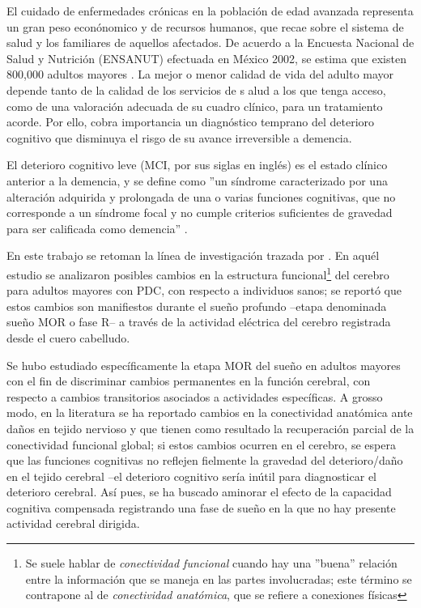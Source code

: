 \documentclass[12pt,a4paper]{mitthesis}
\begin{document}
El cuidado de enfermedades cr\'onicas en la poblaci\'on de edad avanzada representa un gran peso 
econ\'onomico y de recursos humanos, que recae sobre el sistema de salud y los familiares de 
aquellos afectados. 
De acuerdo a la Encuesta Nacional de Salud y Nutrici\'on (ENSANUT) efectuada en M\'exico 2002, se 
estima que existen 800,000 adultos mayores \cite{Sosa12}. 
La mejor o menor calidad de vida del adulto mayor depende tanto de la calidad de los servicios de s
alud a los que tenga acceso, como de una valoraci\'on adecuada de su cuadro cl\'inico, para un 
tratamiento acorde. Por ello, cobra importancia un diagn\'ostico temprano del deterioro cognitivo 
que disminuya el risgo de su avance irreversible a demencia.

El deterioro cognitivo leve (MCI, por sus siglas en ingl\'es) es el estado cl\'inico anterior a la
demencia, y se define como ''un s\'indrome caracterizado por una alteraci\'on adquirida y 
prolongada de una o varias funciones cognitivas, que no corresponde a un s\'indrome focal y no 
cumple criterios suficientes de gravedad para ser calificada como demencia'' \cite{Robles02}.

En este trabajo se retoman %
la l\'inea de investigaci\'on trazada por \cite{VazquezTagle16}.
En aqu\'el estudio se analizaron
posibles cambios en la estructura funcional\footnote{Se suele hablar de 
\textit{conectividad funcional} cuando hay una ''buena'' relaci\'on entre la informaci\'on
que se maneja en las partes involucradas; este t\'ermino se contrapone al de
\textit{conectividad anat\'omica}, que se refiere a conexiones f\'isicas}
del cerebro para adultos mayores con PDC, con 
respecto a individuos sanos; se report\'o que estos cambios son manifiestos durante el sue\~no
profundo --etapa denominada sue\~no MOR o fase R-- 
a trav\'es de la actividad el\'ectrica del cerebro registrada desde el cuero 
cabelludo. 

Se hubo estudiado espec\'ificamente la etapa MOR del sue\~no en adultos mayores
con el fin de discriminar
cambios permanentes en la funci\'on cerebral, con respecto a cambios transitorios asociados
a actividades espec\'ificas.
A grosso modo, en la literatura se ha reportado cambios en la conectividad anat\'omica
ante da\~nos en tejido nervioso y que tienen como resultado la recuperaci\'on parcial
de la conectividad funcional global; si estos cambios ocurren en el cerebro, se espera que las
funciones cognitivas no reflejen fielmente la gravedad del deterioro/da\~no en el tejido cerebral
--el deterioro cognitivo ser\'ia in\'util para diagnosticar el deterioro cerebral.
As\'i pues, se ha buscado aminorar el efecto de la capacidad cognitiva compensada
registrando una fase de sue\~no en la que no hay presente actividad cerebral 
dirigida.
\end{document}
